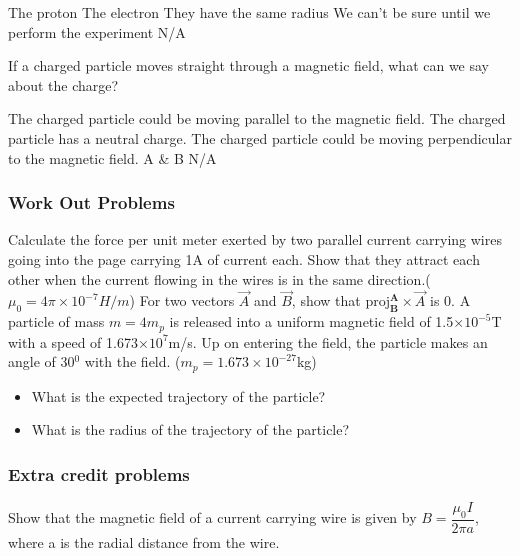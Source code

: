 \documentclass[12pt,addpoints]{exam}
\begin{document}
{{{\begin{questions}
\begin{choices}
 						\choice The proton
 						\choice The electron
 						\choice They have the same radius 
 						\choice We can't be sure until we perform the experiment
 						\choice N/A
 					\end{choices}
 					\question If a charged particle moves straight through a magnetic field, what can we say about the charge?\begin{choices}
 						\choice The charged particle could be moving parallel to the magnetic field.
 						\choice The charged particle has a neutral charge. 
 						\choice The charged particle could be moving perpendicular to the magnetic field.
 						\choice A \& B
 						\choice N/A
 					\end{choices}
					\subsubsection*{Work Out Problems}
					\question Calculate the force per unit meter exerted by two parallel current carrying wires going into the page carrying 1A of current each. Show that they attract each other when the current flowing in the wires is in the same direction.($\mu_0=4\pi\times10^{-7}H/m$) \vspace{1.5in}
					\question For two vectors $\vec{A}$ and $\vec{B}$, show that $\text{proj}^\textbf{A}_{\textbf{B}}\times\vec{A}$ is 0.\vspace{1.5in}
					\question A particle of mass $m=4m_p$ is released into a uniform magnetic field of 1.5$\times10^{-5}$T with a speed of 1.673$\times10^{7}$m/s. Up on entering the field, the particle makes an angle of 30$^0$ with the field. ($m_p=1.673\times10^{-27}$kg)
					\begin{itemize}
						\item What is the expected trajectory of the particle? \vspace{0.2in}
						\item What is the radius of the trajectory of the particle?\vspace{1.5in}
					\end{itemize}
					\subsubsection*{Extra credit problems}
					\question Show that the magnetic field of a current carrying wire is given by $B=\dfrac{\mu_0I}{2\pi a}$, where a is the radial distance from the wire.\vspace{1.5in}
				\end{questions}
				\begin{center}

\end{center}}}}
\end{document}
